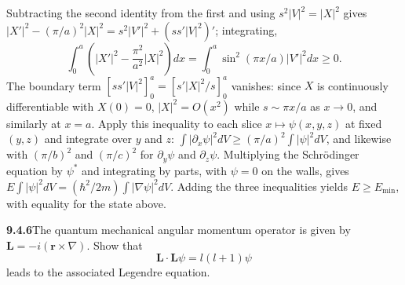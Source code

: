 Subtracting the second identity from the first and using
$s^2|V|^2=|X|^2$ gives
$|X'|^2-(\pi/a)^2|X|^2=s^2|V'|^2+(ss'|V|^2)'$; integrating,
\[
\int_0^a\left(|X'|^2-\frac{\pi^2}{a^2}|X|^2\right)dx
=\int_0^a\sin^2(\pi x/a)|V'|^2dx\ge0.
\]
The boundary term $[ss'|V|^2]_0^a=[s'|X|^2/s]_0^a$ vanishes: since
$X$ is continuously differentiable with $X(0)=0$, $|X|^2=O(x^2)$ while
$s\sim\pi x/a$ as $x\to0$, and similarly at $x=a$.  Apply this
inequality to each slice $x\mapsto\psi(x,y,z)$ at fixed $(y,z)$ and integrate over $y$ and $z$:
$\int|\partial_x\psi|^2dV\ge(\pi/a)^2\int|\psi|^2dV$, and likewise
with $(\pi/b)^2$ and $(\pi/c)^2$ for $\partial_y\psi$ and
$\partial_z\psi$.  Multiplying the Schr\"odinger equation by $\psi^*$
and integrating by parts, with $\psi=0$ on the walls, gives
$E\int|\psi|^2dV=(\hbar^2/2m)\int|\nabla\psi|^2dV$.  Adding the three
inequalities yields $E\ge E_{\min}$, with equality for the state above.


\par\bigskip
\noindent\textbf{9.4.6}\quad The quantum mechanical angular momentum operator
is given by $\mathbf{L}=-i(\mathbf{r}\times\nabla)$. Show that
\[
\mathbf{L}\cdot\mathbf{L}\psi=l(l+1)\psi
\]
leads to the associated Legendre equation.

